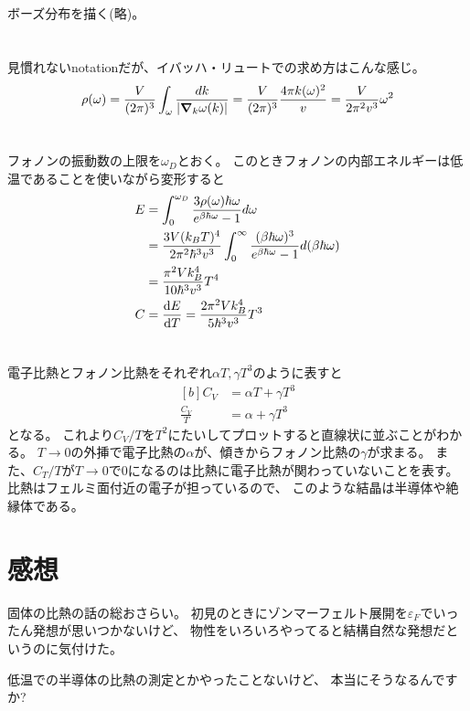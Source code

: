 \documentclass[../ap_2010.tex]{subfiles}
\begin{document}
\section{}
ボーズ分布を描く(略)。

\section{}
見慣れないnotationだが、イバッハ・リュートでの求め方はこんな感じ。
\begin{equation}\begin{aligned}[b]
    \rho(\omega) = \frac{V}{(2\pi)^3}\int_\omega \frac{dk}{\abs{\grad_k \omega(k)}}
    = \frac{V}{(2\pi)^3}\frac{4\pi k(\omega)^2}{v} = \frac{V}{2\pi^2 v^3}\omega^2
\end{aligned}\end{equation}

\section{}
フォノンの振動数の上限を\(\omega_D\)とおく。
このときフォノンの内部エネルギーは低温であることを使いながら変形すると
\begin{equation}\begin{aligned}[b]
    E &= \int_0^{\omega_D}\frac{3\rho(\omega)\hbar\omega}{e^{\beta\hbar\omega}-1}d\omega\\
    &= \frac{3V(k_BT)^4}{2\pi^2\hbar^3v^3}\int_{0}^{\infty}\frac{(\beta\hbar\omega)^3}{e^{\beta\hbar\omega}-1}d(\beta\hbar\omega)\\
    &= \frac{\pi^2Vk_B^4}{10\hbar^3v^3}T^4\\
    C &= \dv{E}{T}=\frac{2\pi^2Vk_B^4}{5\hbar^3v^3}T^3
\end{aligned}\end{equation}

\section{}
電子比熱とフォノン比熱をそれぞれ\(\alpha T,\gamma T^3\)のように表すと
\begin{equation}\begin{aligned}[b]
    C_V &= \alpha T+\gamma T^3\\
    \frac{C_V}{T} &= \alpha +\gamma T^3
\end{aligned}\end{equation}
となる。
これより\(C_V/T\)を\(T^2\)にたいしてプロットすると直線状に並ぶことがわかる。
\(T\to 0\)の外挿で電子比熱の\(\alpha\)が、傾きからフォノン比熱の\(\gamma\)が求まる。
また、\(C_T/T\)が\(T\to 0\)で\(0\)になるのは比熱に電子比熱が関わっていないことを表す。
比熱はフェルミ面付近の電子が担っているので、
このような結晶は半導体や絶縁体である。

\section*{感想}
固体の比熱の話の総おさらい。
初見のときにゾンマーフェルト展開を\(\varepsilon_F\)でいったん発想が思いつかないけど、
物性をいろいろやってると結構自然な発想だというのに気付けた。

低温での半導体の比熱の測定とかやったことないけど、
本当にそうなるんですか?
\end{document}
